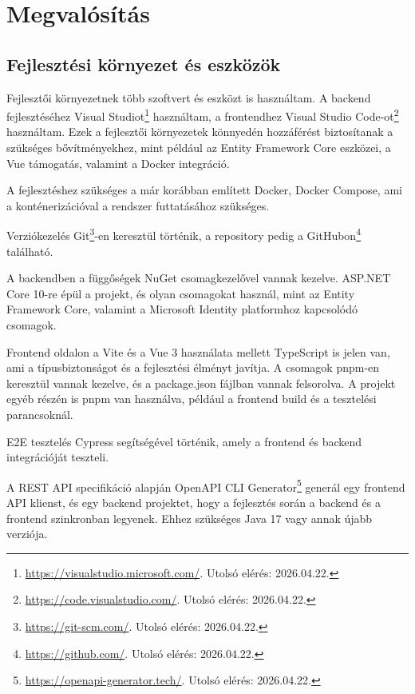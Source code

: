 ﻿\section{Megvalósítás}\label{ch:implementation}

\subsection{Fejlesztési környezet és eszközök}

Fejlesztői környezetnek több szoftvert és eszközt is használtam. A backend fejlesztéséhez Visual Studiot\footnote{\url{https://visualstudio.microsoft.com/}. Utolsó elérés: 2026.04.22.} használtam, a frontendhez Visual Studio Code-ot\footnote{\url{https://code.visualstudio.com/}. Utolsó elérés: 2026.04.22.} használtam. Ezek a fejlesztői környezetek könnyedén hozzáférést biztosítanak a szükséges bővítményekhez, mint például az Entity Framework Core eszközei, a Vue támogatás, valamint a Docker integráció.

A fejlesztéshez szükséges a már korábban említett Docker, Docker Compose, ami a konténerizációval a rendszer futtatásához szükséges.

Verziókezelés Git\footnote{\url{https://git-scm.com/}. Utolsó elérés: 2026.04.22.}-en keresztül történik, a repository pedig a GitHubon\footnote{\url{https://github.com/}. Utolsó elérés: 2026.04.22.} található.

A backendben a függőségek NuGet csomagkezelővel vannak kezelve. ASP.NET Core 10-re épül a projekt, és olyan csomagokat használ, mint az Entity Framework Core, valamint a Microsoft Identity platformhoz kapcsolódó csomagok.

Frontend oldalon a Vite és a Vue 3 használata mellett TypeScript is jelen van, ami a típusbiztonságot és a fejlesztési élményt javítja. A csomagok pnpm-en keresztül vannak kezelve, és a package.json fájlban vannak felsorolva. A projekt egyéb részén is pnpm van használva, például a frontend build és a tesztelési parancsoknál.

E2E tesztelés Cypress\cite{cypress} segítségével történik, amely a frontend és backend integrációját teszteli. 

A REST API specifikáció alapján OpenAPI CLI Generator\footnote{\url{https://openapi-generator.tech/}. Utolsó elérés: 2026.04.22.} generál egy frontend API klienst, és egy backend projektet, hogy a fejlesztés során a backend és a frontend szinkronban legyenek. Ehhez szükséges Java 17 vagy annak újabb verziója.

